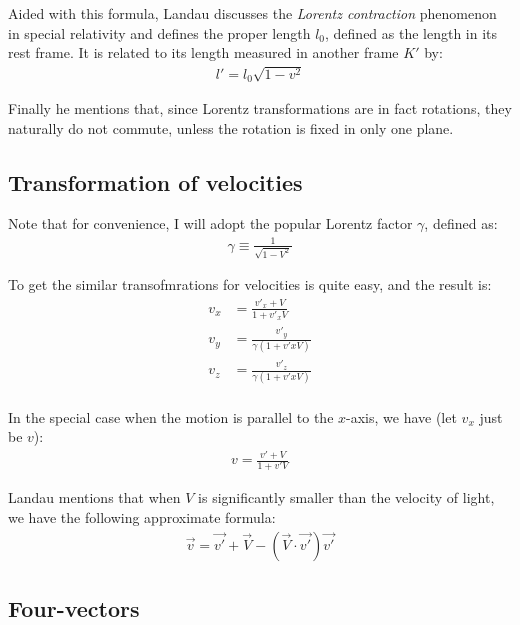 \documentclass{article}
\numberwithin{equation}{subsection} %
\theoremstyle{definition}
\begin{document}
    Aided with this formula, Landau discusses the \textit{Lorentz
    contraction} phenomenon in special relativity and defines
    the proper length
    $l_0$, defined as the length in its rest frame. It is related
    to its length measured in another frame $K'$ by:
    \begin{align}
        l' = l_0 \sqrt{1-v^2}
    \end{align}

    Finally he mentions that, since Lorentz transformations are
    in fact rotations, they naturally do not commute, unless the
    rotation is fixed in only one plane.

    \subsection{Transformation of velocities}
    \label{sec:Transformation_of_velocities}
    
    Note that for convenience, I will adopt the popular Lorentz factor
    $\gamma$, defined as:
    \begin{align}
        \gamma \equiv \frac{1}{\sqrt{1-V^2}}
    \end{align}

    To get the similar transofmrations for velocities is quite easy,
    and the result is:
    \begin{align}
        v_x &= \frac{v'_x + V}{1+ v'_x V}\\
        v_y &= \frac{v'_y}{\gamma \left(1+v'x V\right)}\\
        v_z &= \frac{v'_z}{\gamma \left(1+v'x V\right)}\\
    \end{align}

    In the special case when the motion is parallel to the $x$-axis,
    we have (let $v_x$ just be $v$):
    \begin{align}
        v = \frac{v'+V}{1+v' V}
    \end{align}
    
    Landau mentions that when $V$ is significantly smaller than the
    velocity of light, we have the following approximate formula:
    \begin{align}
        \vec{v} = \vec{v'} + \vec{V} - (\vec{V}\cdot\vec{v'}) \vec{v'}
    \end{align}


    \subsection{Four-vectors}
    \label{sec:Four-vectors}
    
\end{document}
